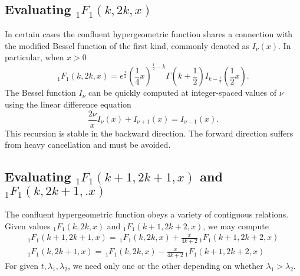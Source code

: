 \documentclass{article}
\begin{document}
\subsection*{Evaluating $_1F_1(k, 2k, x)$}
In certain cases the confluent hypergeometric function shares a connection 
with the modified Bessel function of the first kind, commonly denoted 
as $I_\nu(x)$. In particular, when $x > 0$
\begin{equation*}
  _1F_1(k, 2k, x) = e^{\frac{x}{2}}\left(\frac{1}{4}x\right)^{\frac{1}{2} - k}
\Gamma\left(k + \frac{1}{2}\right)I_{k-\frac{1}{2}}\left(\frac{1}{2}x\right).
\end{equation*}
The Bessel function $I_\nu$ can be quickly computed at integer-spaced values
of $\nu$ using the linear difference equation
\begin{equation*}
\frac{2\nu}{x}I_\nu(x) + I_{\nu + 1}(x) = I_{\nu - 1}(x).
\end{equation*}
This recursion is stable in the backward direction. The forward direction 
suffers from heavy cancellation and must be avoided.
\subsection*{Evaluating $_1F_1(k + 1, 2k + 1, x)$ and $_1F_1(k, 2k + 1,. x)$}
The confluent hypergeometric function obeys a variety of contiguous relations.
Given values $_1F_1(k, 2k, x)$ and $_1F_1(k + 1, 2k + 2, x)$, we may compute
\begin{gather*}
  _1F_1(k + 1, 2k + 1, x) = \,_1F_1(k, 2k, x) + \frac{x}{4k + 2}\,_1F_1(k + 1,2k
  + 2, x) \\
  _1F_1(k, 2k + 1, x) = \,_1F_1(k, 2k, x) - \frac{x}{4k + 2}\,_1F_1(k + 1,2k
  + 2, x)
\end{gather*}
For given $t, \lambda_1, \lambda_2$, we need only one or the other depending
on whether $\lambda_1 > \lambda_2$.
\end{document}
